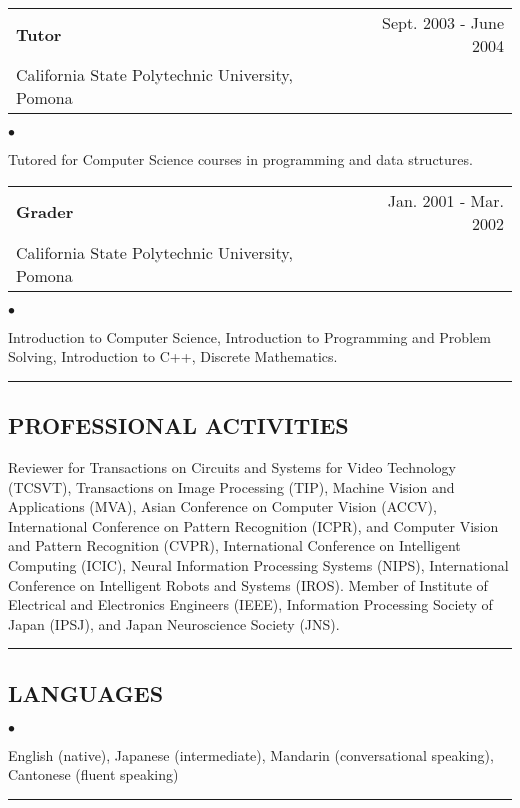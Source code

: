 \documentclass[letterpaper,10pt]{article}
\newcommand{\myline}{ \rule{\textwidth}{0.01in} }
\newenvironment{smallitemize}{
  \begin{list}{$\bullet$}{
    \setlength{\leftmargin}{3.5em}
        \setlength{\topmargin}{-1.0em}
    \setlength{\itemsep}{-0.10em}
    \setlength{\parskip}{-0.8em}
    \setlength{\parsep}{0.10em}
  }
}{
  \end{list}
}
\renewcommand{\bf}{\bfseries}
\begin{document}
\begin{tabularx}{\textwidth}{b{}r}
        \bf{Tutor} & Sept. 2003 - June 2004\\
        {California State Polytechnic University, Pomona} &\\
\end{tabularx}
\begin{smallitemize} \normalfont
        \item Tutored for Computer Science courses in programming and data structures.
\end{smallitemize}
\begin{tabularx}{\textwidth}{b{}r}
        \bf{Grader} & Jan. 2001 - Mar. 2002\\
        {California State Polytechnic University, Pomona} &\\
\end{tabularx}
\begin{smallitemize} \normalfont
        \item Introduction to Computer Science, Introduction to Programming and Problem Solving, Introduction to C++, Discrete Mathematics.
\end{smallitemize}
\myline
\subsection*{PROFESSIONAL ACTIVITIES}
Reviewer for Transactions on Circuits and Systems for Video Technology (TCSVT), Transactions on Image Processing (TIP), Machine Vision and Applications (MVA), Asian Conference on Computer Vision (ACCV), International Conference on Pattern Recognition (ICPR), and Computer Vision and Pattern Recognition (CVPR), International Conference on Intelligent Computing (ICIC), Neural Information Processing Systems (NIPS), International Conference on Intelligent Robots and Systems (IROS).
Member of Institute of Electrical and Electronics Engineers (IEEE), Information Processing Society of Japan (IPSJ),  and Japan Neuroscience Society (JNS).

\myline
\subsection*{LANGUAGES}
\vspace{0.08in}
\begin{smallitemize} \normalfont
        \item English (native), Japanese (intermediate), Mandarin (conversational speaking), Cantonese (fluent speaking)
\end{smallitemize}
\vspace{-0.05in}
\myline
\end{document}
